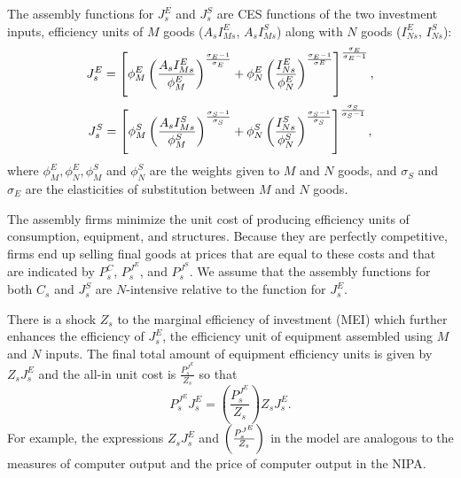 \documentclass[12pt,fleqn]{article}
\begin{document}
{\normalsize The assembly functions for $J_{s}^{E}$ and $J_{s}^{S}$ are CES
functions of the two investment inputs, efficiency units of $M$ goods ($%
A_sI_{Ms}^{E}$, $A_sI_{Ms}^{S}$) along with $N$ goods ($I_{Ns}^{E}$, $%
I_{Ns}^{S}$):
\begin{equation}
J_{s}^{E}=\left[ \phi _{M}^{E}\left( \frac{A_s I_{Ms}^{E}}{\phi _{M}^{E}}%
\right) ^{\frac{\sigma _{E}-1}{\sigma _{E}}}+\phi _{N}^{E}\left( \frac{%
I_{Ns}^{E}}{\phi _{N}^{E}}\right) ^{\frac{\sigma _{E}-1}{\sigma E}}\right] ^{%
\frac{\sigma _{E}}{\sigma _{E}-1}},  \label{equipment assembly}
\end{equation}%
\begin{equation}
J_{s}^{S}=\left[ \phi _{M}^{S}\left( \frac{A_sI_{Ms}^{S}}{\phi _{M}^{S}}%
\right) ^{\frac{\sigma _{S}-1}{\sigma _{S}}}+\phi _{N}^{S}\left( \frac{%
I_{Ns}^{S}}{\phi _{N}^{S}}\right) ^{\frac{\sigma _{S}-1}{\sigma _{S}}}\right]
^{\frac{\sigma _{S}}{\sigma _{S}-1}},
\end{equation}%
where $\phi _{M}^{E},\phi _{N}^{E},\phi _{M}^{S}$ and $\phi _{N}^{S}$ are
the weights given to $M$ and $N$ goods, and $\sigma _{S}$ and $\sigma _{E}$
are the elasticities of substitution between $M$ and $N$ goods.  }

{\normalsize The assembly firms minimize the unit cost of producing
efficiency units of consumption, equipment, and structures. Because they are
perfectly competitive, firms end up selling final goods at prices that are
equal to these costs and that are indicated by $P_{s}^{C}$, $P_{s}^{J^{E}}$,
and $P_{s}^{J^{S}}$. We assume that the assembly functions for both $C_{s}$
and $J_{s}^{S}$ are $N$-intensive relative to the function for $J_{s}^{E}$. }

{\normalsize There is a shock $Z_s$ to the marginal efficiency of investment (MEI) which further enhances the efficiency of $J_{s}^{E}$, the
efficiency unit of equipment assembled using $M$ and $N$ inputs. The final
total amount of equipment efficiency units is given by $Z_s J_{s}^{E}$ and
the all-in unit cost is $\frac{P_{s}^{J^{E}}}{Z_s}$ so that%
\begin{equation}
P_{s}^{J^{E}}J_{s}^{E}=\left( \frac{P_{s}^{J^{E}}}{Z_s}\right) Z_sJ_{s}^{E}.
\end{equation}%
For example, the expressions $Z_sJ_{s}^{E}$ and $\left( \frac{P_{s}^{J^{E}}}{%
Z_s}\right)$ in the model are analogous to the measures of computer output
and the price of computer output in the NIPA. }
\end{document}

